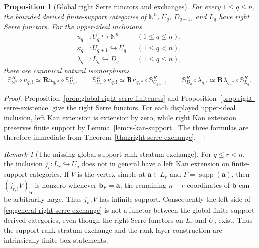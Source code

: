 \documentclass[12pt,reqno]{amsart}
\newtheorem{proposition}[theorem]{Proposition}
\theoremstyle{definition}
\theoremstyle{remark}
\newtheorem{remark}[theorem]{Remark}
\begin{document}
\begin{proposition}[Global right Serre functors and exchanges]
\label{prop:global-right-serre}
For every $1\le q\le n$, the bounded derived finite-support categories of
$\mathbb N^n$, $U_q$, $D_{q-1}$, and $L_q$ have right Serre functors.  For
the upper-ideal inclusions
\[
\begin{aligned}
u_q&:U_q\hookrightarrow\mathbb N^n &&(1\le q\le n),\\
\kappa_q&:U_{q+1}\hookrightarrow U_q &&(1\le q<n),\\
\lambda_q&:L_q\hookrightarrow D_q &&(1\le q\le n),
\end{aligned}
\]
there are canonical natural isomorphisms
\[
\mathbb S_{\mathbb N^n}^R\circ u_{q,!}
\simeq\mathbf Ru_{q,*}\circ\mathbb S_{U_q}^R,
\qquad
\mathbb S_{U_q}^R\circ\kappa_{q,!}
\simeq\mathbf R\kappa_{q,*}\circ\mathbb S_{U_{q+1}}^R,
\qquad
\mathbb S_{D_q}^R\circ\lambda_{q,!}
\simeq\mathbf R\lambda_{q,*}\circ\mathbb S_{L_q}^R.
\]
\end{proposition}

\begin{proof}
Proposition~\ref{prop:global-right-serre-finiteness} and
Proposition~\ref{prop:right-serre-existence} give the right Serre functors.
For each displayed upper-ideal inclusion, left Kan extension is extension by
zero, while right Kan extension preserves finite support by
Lemma~\ref{lem:fs-kan-support}.  The three formulas are therefore immediate
from Theorem~\ref{thm:right-serre-exchange}.
\end{proof}

\begin{remark}[The missing global support-rank-stratum exchange]
\label{rem:global-rank-kan-failure}
For $q\le r<n$, the inclusion $j_r:L_r\hookrightarrow U_q$ does not in
general have a left Kan extension on finite-support categories.  If $V$ is
the vertex simple at $\mathbf a\in L_r$ and
$F=\operatorname{supp}(\mathbf a)$, then $(j_{r,!}V)_{\mathbf b}$ is nonzero
whenever $\mathbf b_F=\mathbf a$; the remaining $n-r$ coordinates of
$\mathbf b$ can be arbitrarily large.  Thus $j_{r,!}V$ has infinite support.
Consequently the left side of
\eqref{eq:general-right-serre-exchange} is not a functor between the global
finite-support derived categories, even though the right Serre functors on
$L_r$ and $U_q$ exist.  Thus the support-rank-stratum exchange and the
rank-layer construction are intrinsically finite-box statements.
\end{remark}
\end{document}
